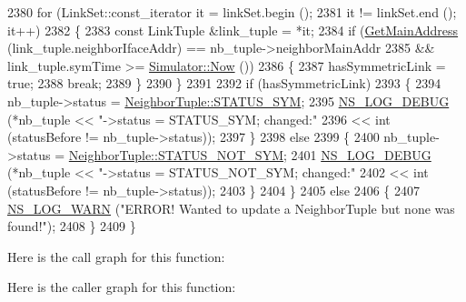 \begin{DoxyCode}
2380       \textcolor{keywordflow}{for} (LinkSet::const\_iterator it = linkSet.begin ();
2381            it != linkSet.end (); it++)
2382         \{
2383           \textcolor{keyword}{const} LinkTuple &link\_tuple = *it;
2384           \textcolor{keywordflow}{if} (\hyperlink{classns3_1_1olsr_1_1RoutingProtocol_ae01451170fb389d322b33ed6d954f460}{GetMainAddress} (link\_tuple.neighborIfaceAddr) == nb\_tuple->neighborMainAddr
2385               && link\_tuple.symTime >= \hyperlink{classns3_1_1Simulator_ac3178fa975b419f7875e7105be122800}{Simulator::Now} ())
2386             \{
2387               hasSymmetricLink = \textcolor{keyword}{true};
2388               \textcolor{keywordflow}{break};
2389             \}
2390         \}
2391 
2392       \textcolor{keywordflow}{if} (hasSymmetricLink)
2393         \{
2394           nb\_tuple->status = \hyperlink{structns3_1_1olsr_1_1NeighborTuple_ad4b623edaedb3a5244291c738ce87e12a1649b9e4d61ac6e27eff65e8bd5dfe15}{NeighborTuple::STATUS\_SYM};
2395           \hyperlink{group__logging_ga413f1886406d49f59a6a0a89b77b4d0a}{NS\_LOG\_DEBUG} (*nb\_tuple << \textcolor{stringliteral}{"->status = STATUS\_SYM; changed:"}
2396                                   << \textcolor{keywordtype}{int} (statusBefore != nb\_tuple->status));
2397         \}
2398       \textcolor{keywordflow}{else}
2399         \{
2400           nb\_tuple->status = \hyperlink{structns3_1_1olsr_1_1NeighborTuple_ad4b623edaedb3a5244291c738ce87e12ab633cfd28c2ec5d1f2b6deec3c7ebcf9}{NeighborTuple::STATUS\_NOT\_SYM};
2401           \hyperlink{group__logging_ga413f1886406d49f59a6a0a89b77b4d0a}{NS\_LOG\_DEBUG} (*nb\_tuple << \textcolor{stringliteral}{"->status = STATUS\_NOT\_SYM; changed:"}
2402                                   << \textcolor{keywordtype}{int} (statusBefore != nb\_tuple->status));
2403         \}
2404     \}
2405   \textcolor{keywordflow}{else}
2406     \{
2407       \hyperlink{group__logging_gade7208b4009cdf0e25783cd26766f559}{NS\_LOG\_WARN} (\textcolor{stringliteral}{"ERROR! Wanted to update a NeighborTuple but none was found!"});
2408     \}
2409 \}
\end{DoxyCode}


Here is the call graph for this function\+:




Here is the caller graph for this function\+:


